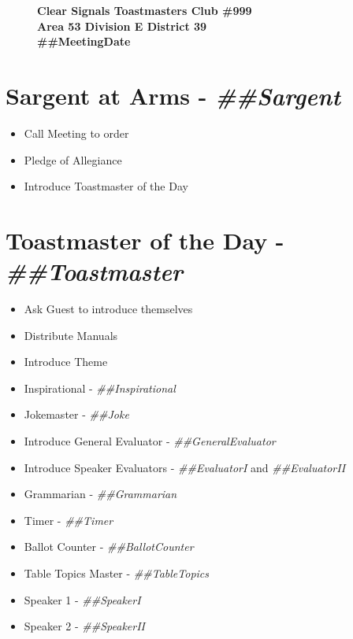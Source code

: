\documentclass{article}
\newcommand{\meetingDate}{##MeetingDate}
\newcommand{\toastmaster}{##Toastmaster}
\newcommand{\sargent}{##Sargent}
\newcommand{\tableTopics}{##TableTopics}
\newcommand{\generalEvaluator}{##GeneralEvaluator}
\newcommand{\evaluatorI}{##EvaluatorI}
\newcommand{\evaluatorII}{##EvaluatorII}
\newcommand{\speakerI}{##SpeakerI}
\newcommand{\speakerII}{##SpeakerII}
\newcommand{\grammarian}{##Grammarian}
\newcommand{\timer}{##Timer}
\newcommand{\inspirational}{##Inspirational}
\newcommand{\ballotCounter}{##BallotCounter}
\newcommand{\joke}{##Joke}
\begin{document}
\begin{figure}
  \centering
  \linespread{1}
  \large\textbf{Clear Signals Toastmasters Club \#999\\Area 53 Division E District 39\\ \meetingDate{}} \\
\end{figure}

\section*{Sargent at Arms - \textit{\sargent{}}}
\begin{itemize}
  \item Call Meeting to order
  \item Pledge of Allegiance
  \item Introduce Toastmaster of the Day
\end{itemize}

\section*{Toastmaster of the Day - \textit{\toastmaster{}}} 
\begin{itemize}
  \item Ask Guest to introduce themselves
  \item Distribute Manuals
  \item Introduce Theme
  \item Inspirational - \textit{\inspirational{}}
  \item Jokemaster - \textit{\joke{}}
  \item Introduce General Evaluator - \textit{\generalEvaluator{}}
  \item Introduce Speaker Evaluators - \textit{\evaluatorI{}} and \textit{\evaluatorII{}}
  \item Grammarian - \textit{\grammarian{}}
  \item Timer - \textit{\timer{}}
  \item Ballot Counter - \textit{\ballotCounter{}}
  \item Table Topics Master - \textit{\tableTopics{}}
  \item Speaker 1 - \textit{\speakerI{}}
  \item Speaker 2 - \textit{\speakerII{}}
\end{itemize}
\end{document}
